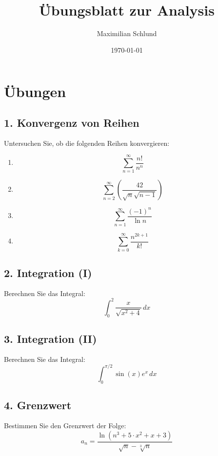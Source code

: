 \documentclass[a4paper,12pt]{article}
\title{Übungsblatt zur Analysis}
\author{Maximilian Schlund}
\date{\today}
\begin{document}
\maketitle

\section*{Übungen}

\subsection*{1. Konvergenz von Reihen}
Untersuchen Sie, ob die folgenden Reihen konvergieren:
\begin{enumerate}
    \item[a)] $$\sum_{n=1}^\infty \frac{n!}{n^n}$$
    \item[b)] $$\sum_{n=2}^\infty \left( \frac{42}{\sqrt{n} \sqrt{n-1}} \right)$$
    \item[c)] $$\sum_{n=1}^\infty \frac{(-1)^n}{\ln{n}}$$
    \item[d)] $$\sum_{k=0}^\infty \frac{n^{2k+1}}{k!}$$
\end{enumerate}

\subsection*{2. Integration (I)}
Berechnen Sie das Integral:
\[
\int_0^2 \frac{x}{\sqrt{x^2 + 4}} \, dx
\]

\subsection*{3. Integration (II)}
Berechnen Sie das Integral:
\[
\int_0^{\pi/2} \sin(x) e^x \, dx
\]

\subsection*{4. Grenzwert}
Bestimmen Sie den Grenzwert der Folge:
\[
a_n = \frac{\ln(n^3 + 5\cdot x^2 + x + 3)}{\sqrt{n} - \sqrt[3]{n}}
\]
\end{document}
